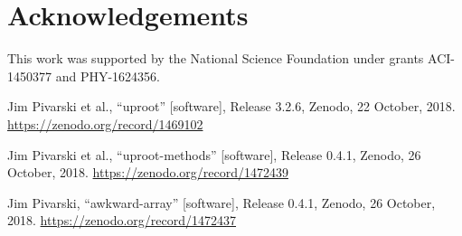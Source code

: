 \documentclass{webofc}
\begin{document}
\section{Acknowledgements}

This work was supported by the National Science Foundation under grants ACI-1450377 and PHY-1624356.

\begin{thebibliography}{8}

 Jim Pivarski et al., ``uproot'' [software], Release 3.2.6, Zenodo, 22 October, 2018. \url{https://zenodo.org/record/1469102}

 Jim Pivarski et al., ``uproot-methods'' [software], Release 0.4.1, Zenodo, 26 October, 2018. \url{https://zenodo.org/record/1472439}

 Jim Pivarski, ``awkward-array'' [software], Release 0.4.1, Zenodo, 26 October, 2018. \url{https://zenodo.org/record/1472437}
\end{thebibliography}




\end{document}
